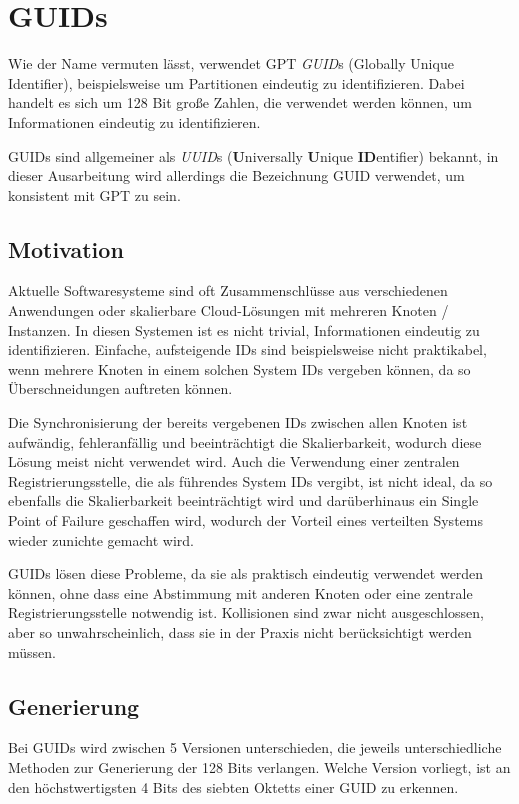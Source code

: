 \section{GUIDs}

Wie der Name vermuten lässt, verwendet GPT \textit{GUID}s (Globally Unique Identifier), beispielsweise um Partitionen eindeutig zu identifizieren.
Dabei handelt es sich um 128 Bit große Zahlen, die verwendet werden können, um Informationen eindeutig zu identifizieren.

GUIDs sind allgemeiner als \textit{UUID}s (\textbf{U}niversally \textbf{U}nique \textbf{ID}entifier) bekannt, in dieser Ausarbeitung wird allerdings die Bezeichnung GUID verwendet, um konsistent mit GPT zu sein.

\subsection{Motivation}
Aktuelle Softwaresysteme sind oft Zusammenschlüsse aus verschiedenen Anwendungen oder skalierbare Cloud-Lösungen mit mehreren Knoten / Instanzen.
In diesen Systemen ist es nicht trivial, Informationen eindeutig zu identifizieren. Einfache, aufsteigende IDs sind beispielsweise nicht praktikabel, wenn mehrere Knoten in einem solchen System IDs vergeben können, da so Überschneidungen auftreten können.

Die Synchronisierung der bereits vergebenen IDs zwischen allen Knoten ist aufwändig, fehleranfällig und beeinträchtigt die Skalierbarkeit, wodurch diese Lösung meist nicht verwendet wird.
Auch die Verwendung einer zentralen Registrierungsstelle, die als führendes System IDs vergibt, ist nicht ideal, da so ebenfalls die Skalierbarkeit beeinträchtigt wird und darüberhinaus ein Single Point of Failure geschaffen wird, wodurch der Vorteil eines verteilten Systems wieder zunichte gemacht wird.

GUIDs lösen diese Probleme, da sie als praktisch eindeutig verwendet werden können, ohne dass eine Abstimmung mit anderen Knoten oder eine zentrale Registrierungsstelle notwendig ist.
Kollisionen sind zwar nicht ausgeschlossen, aber so unwahrscheinlich, dass sie in der Praxis nicht berücksichtigt werden müssen.


\subsection{Generierung}
Bei GUIDs wird zwischen 5 Versionen unterschieden, die jeweils unterschiedliche Methoden zur Generierung der 128 Bits verlangen.
Welche Version vorliegt, ist an den höchstwertigsten 4 Bits des siebten Oktetts einer GUID zu erkennen.

